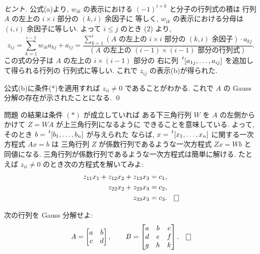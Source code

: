 \documentclass[12pt,twoside]{jarticle}
\begin{document}
\begin{proof}[ヒント]
  公式(a)より, $w_{ik}$ の表示における $(-1)^{i+k}$ と分子の行列式の積は
  行列 $A$ の左上の $i\times i$ 部分の $(k,i)$ 余因子に
  等しく, $w_{ik}$ の表示における分母は $(i,i)$ 余因子に等しい.
  よって $i\le j$ のとき (2) より,
  \begin{equation*}
    z_{ij} 
    = \sum_{k=1}^{i-1} w_{ik}a_{kj} + a_{ij}
    = 
    \frac{
      \sum_{k=1}^i 
      (\text{$A$ の左上の $i\times i$ 部分の $(k,i)$ 余因子})
      \cdot a_{kj}
      }{
      (\text{$A$ の左上の $(i-1)\times(i-1)$ 部分の行列式})
      }.
  \end{equation*}
  この式の分子は $A$ の左上の $i\times(i-1)$ 部分の
  右に列 $\tp{[a_{1j},\ldots,a_{ij}]}$ を追加して得られる行列の
  行列式に等しい.  これで $z_{ij}$ の表示(b)が得られた.

  公式(b)に条件($*$)を適用すれば $z_{ii}\ne 0$ であることがわかる.
  これで $A$ の Gauss 分解の存在が示されたことになる.
  \qed
\end{proof}


\begin{guide}
  問題  の結果は条件 $(*)$ が成立していれば
  ある下三角行列 $W$ を $A$ の左側からかけて $Z=WA$ が上三角行列になるように
  できることを意味している. 
  よって, そのとき $b=\tp{[b_1,\ldots,b_n]}$ が与えられた
  ならば, $x=\tp{[x_1,\ldots,x_n]}$ に関する一次方程式 $Ax=b$ は
  三角行列 $Z$ が係数行列であるような一次方程式 $Zx=Wb$ と同値になる.
  三角行列が係数行列であるような一次方程式は簡単に解ける.
  たとえば $z_{ii}\ne 0$ のとき次の方程式を解いてみよ:
  \begin{align*}
    z_{11} x_1 + z_{12}x_2 + z_{13}x_3 &= c_1, 
    \\           z_{22}x_2 + z_{23}x_3 &= c_2, 
    \\                       z_{33}x_3 &= c_3.
    \qed
  \end{align*}
\end{guide}


\begin{question}
  次の行列を Gauss 分解せよ:
  \begin{equation*}
    A = 
    \begin{bmatrix}
      a & b \\
      c & d \\
    \end{bmatrix},
    \qquad
    B = 
    \begin{bmatrix}
      a & b & c \\
      d & e & f \\
      g & h & k \\
    \end{bmatrix}.
    \qed
  \end{equation*}
\end{question}
\end{document}
